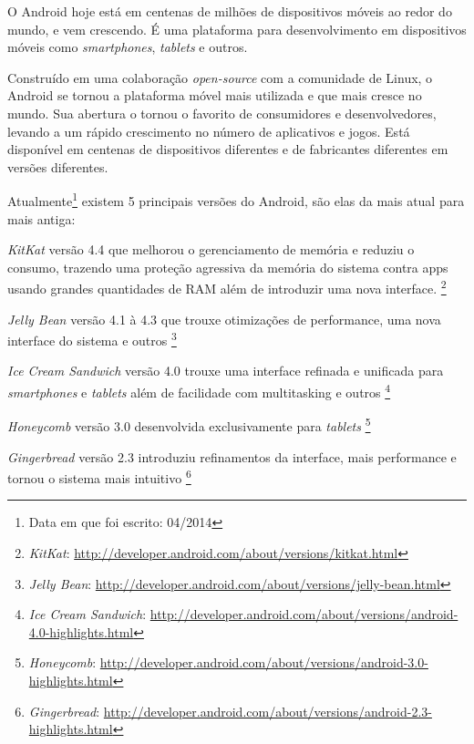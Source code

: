 \documentclass[a4paper,12pt,brazil,oneside]{book}
\begin{document}
\begin{singlespace}

O Android hoje está em centenas de milhões de dispositivos móveis ao redor do mundo, e vem crescendo. É uma plataforma para desenvolvimento em dispositivos móveis como \emph{smartphones}, \emph{tablets} e outros. 

Construído em uma colaboração \emph{open-source} com a comunidade de Linux, o Android se tornou a plataforma móvel mais utilizada e que mais cresce no mundo. Sua abertura o tornou o favorito de consumidores e desenvolvedores, levando a um rápido crescimento no número de aplicativos e jogos. Está disponível em centenas de dispositivos diferentes e de fabricantes diferentes em versões diferentes.

Atualmente\footnote{Data em que foi escrito: 04/2014} existem 5 principais versões do Android, são elas da mais atual para mais antiga:
\bi
\item \emph{KitKat} versão 4.4 que melhorou o gerenciamento de memória e reduziu o consumo, trazendo uma proteção agressiva da memória do sistema contra apps usando grandes quantidades de RAM além de introduzir uma nova interface.
\footnote{\emph{KitKat}: \href{http://developer.android.com/about/versions/kitkat.html}{http://developer.android.com/about/versions/kitkat.html}}
\item \emph{Jelly Bean} versão 4.1 à 4.3 que trouxe otimizações de performance, uma nova interface do sistema e outros
\footnote{\emph{Jelly Bean}: \href{http://developer.android.com/about/versions/jelly-bean.html}{http://developer.android.com/about/versions/jelly-bean.html}}
\item \emph{Ice Cream Sandwich} versão 4.0 trouxe uma interface refinada e unificada para \emph{smartphones} e \emph{tablets} além de facilidade com multitasking e outros
\footnote{\emph{Ice Cream Sandwich}: \href{http://developer.android.com/about/versions/android-4.0-highlights.html}{http://developer.android.com/about/versions/android-4.0-highlights.html}}
\item \emph{Honeycomb} versão 3.0 desenvolvida exclusivamente para \emph{tablets}
\footnote{\emph{Honeycomb}: \href{http://developer.android.com/about/versions/android-3.0-highlights.html}{http://developer.android.com/about/versions/android-3.0-highlights.html}}
\item \emph{Gingerbread} versão 2.3 introduziu refinamentos da interface, mais performance e tornou o sistema mais intuitivo
\footnote{\emph{Gingerbread}: \href{http://developer.android.com/about/versions/android-2.3-highlights.html}{http://developer.android.com/about/versions/android-2.3-highlights.html}}
\ei


\end{singlespace}
\end{document}
